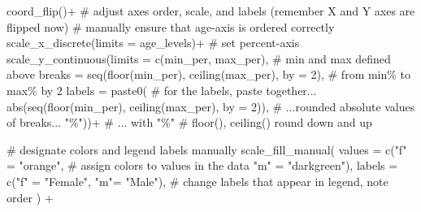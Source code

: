 \documentclass[
]{article}
\newenvironment{Shaded}{\begin{snugshade}}{\end{snugshade}}
\newcommand{\CommentTok}[1]{\textcolor[rgb]{0.50,0.62,0.50}{#1}}
\newcommand{\DataTypeTok}[1]{\textcolor[rgb]{0.87,0.87,0.75}{#1}}
\newcommand{\DecValTok}[1]{\textcolor[rgb]{0.86,0.86,0.80}{#1}}
\newcommand{\KeywordTok}[1]{\textcolor[rgb]{0.94,0.87,0.69}{#1}}
\newcommand{\NormalTok}[1]{\textcolor[rgb]{0.80,0.80,0.80}{#1}}
\newcommand{\OperatorTok}[1]{\textcolor[rgb]{0.94,0.94,0.82}{#1}}
\newcommand{\StringTok}[1]{\textcolor[rgb]{0.80,0.58,0.58}{#1}}
\begin{document}
\begin{Shaded}
\begin{Highlighting}[]
\StringTok{  }\KeywordTok{coord\_flip}\NormalTok{()}\OperatorTok{+}
\StringTok{  }
\StringTok{  }\CommentTok{\# adjust axes order, scale, and labels (remember X and Y axes are flipped now)}
\StringTok{  }\CommentTok{\# manually ensure that age{-}axis is ordered correctly}
\StringTok{  }\KeywordTok{scale\_x\_discrete}\NormalTok{(}\DataTypeTok{limits =}\NormalTok{ age\_levels)}\OperatorTok{+}\StringTok{ }
\StringTok{  }
\StringTok{  }\CommentTok{\# set percent{-}axis }
\StringTok{  }\KeywordTok{scale\_y\_continuous}\NormalTok{(}\DataTypeTok{limits =} \KeywordTok{c}\NormalTok{(min\_per, max\_per),                                          }\CommentTok{\# min and max defined above}
                     \DataTypeTok{breaks =} \KeywordTok{seq}\NormalTok{(}\KeywordTok{floor}\NormalTok{(min\_per), }\KeywordTok{ceiling}\NormalTok{(max\_per), }\DataTypeTok{by =} \DecValTok{2}\NormalTok{),                }\CommentTok{\# from min\% to max\% by 2 }
                     \DataTypeTok{labels =} \KeywordTok{paste0}\NormalTok{(                                                       }\CommentTok{\# for the labels, paste together... }
                       \KeywordTok{abs}\NormalTok{(}\KeywordTok{seq}\NormalTok{(}\KeywordTok{floor}\NormalTok{(min\_per), }\KeywordTok{ceiling}\NormalTok{(max\_per), }\DataTypeTok{by =} \DecValTok{2}\NormalTok{)),                  }\CommentTok{\# ...rounded absolute values of breaks... }
                       \StringTok{"\%"}\NormalTok{))}\OperatorTok{+}\StringTok{                                                               }\CommentTok{\# ... with "\%"}
\StringTok{                                                                                            }\CommentTok{\# floor(), ceiling() round down and up }

\StringTok{  }\CommentTok{\# designate colors and legend labels manually}
\StringTok{  }\KeywordTok{scale\_fill\_manual}\NormalTok{(}
    \DataTypeTok{values =} \KeywordTok{c}\NormalTok{(}\StringTok{"f"}\NormalTok{ =}\StringTok{ "orange"}\NormalTok{,         }\CommentTok{\# assign colors to values in the data}
               \StringTok{"m"}\NormalTok{ =}\StringTok{ "darkgreen"}\NormalTok{),}
    \DataTypeTok{labels =} \KeywordTok{c}\NormalTok{(}\StringTok{"f"}\NormalTok{ =}\StringTok{ "Female"}\NormalTok{,}
               \StringTok{"m"}\NormalTok{=}\StringTok{ "Male"}\NormalTok{),      }\CommentTok{\# change labels that appear in legend, note order}
\NormalTok{  ) }\OperatorTok{+}


\end{Highlighting}
\end{Shaded}
\end{document}
